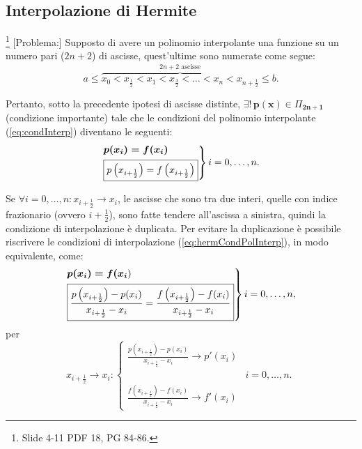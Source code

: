 \subsection{Interpolazione di Hermite}\footnote{Slide 4-11 PDF 18, PG 84-86.}
[Problema:] Supposto di avere un polinomio interpolante una funzione su un numero pari ($2n+2$) di ascisse, quest'ultime sono numerate come segue:
\begin{equation}
    a\leq\overbrace{x_0 < x_{\frac{1}{2}} < x_1 < x_{\frac{3}{2}} < \hdots < x_n < x_{n+\frac{1}{2}}}^{2n+2\text{ ascisse}}\leq b.
\end{equation}

Pertanto, sotto la precedente ipotesi di ascisse distinte, $\boldsymbol{\exists!\, p(x)}\in\Pi_{\boldsymbol{2n+1}}$ (condizione importante) tale che le condizioni del polinomio interpolante (\ref{eq:condInterp}) diventano le seguenti:
\begin{equation}\label{eq:hermCondPolInterp}
    \begin{rcases}
        \boldsymbol{p(x_i)=f(x_i)}\\
        \boxed{p\left(x_{i+\frac{1}{2}}\right)=f\left(x_{i+\frac{1}{2}}\right)}
    \end{rcases} i=0,\hdots,n.
\end{equation}

Se $\forall i=0,\hdots,n: x_{i+\frac{1}{2}}\rightarrow x_i$, le ascisse che sono tra due interi, quelle con indice frazionario (ovvero $i+\frac{1}{2}$), sono fatte tendere all'ascissa a sinistra, quindi la condizione di interpolazione è duplicata. Per evitare la duplicazione è possibile riscrivere le condizioni di interpolazione (\ref{eq:hermCondPolInterp}), in modo equivalente, come:
\begin{equation}\label{eq:hermCondPolInterpMod}
    \begin{rcases}
        \boldsymbol{p(x_i)=f(x_i})\\
        \boxed{\frac{p\left(x_{i+\frac{1}{2}}\right)-p(x_i)}{x_{i+\frac{1}{2}}-x_i}=\frac{f\left(x_{i+\frac{1}{2}}\right)-f(x_i)}{x_{i+\frac{1}{2}}-x_i}}
     \end{rcases} i=0,\hdots,n,
\end{equation}
per
\begin{equation*}
    x_{i+\frac{1}{2}}\rightarrow x_i:
    \begin{cases}
        \frac{p\left(x_{i+\frac{1}{2}}\right)-p(x_i)}{x_{i+\frac{1}{2}}-x_i}\rightarrow p'(x_i)\\
        & i=0,\hdots, n.\\
        \frac{f\left(x_{i+\frac{1}{2}}\right)-f(x_i)}{x_{i+\frac{1}{2}}-x_i}\rightarrow f'(x_i)
    \end{cases}
\end{equation*}

